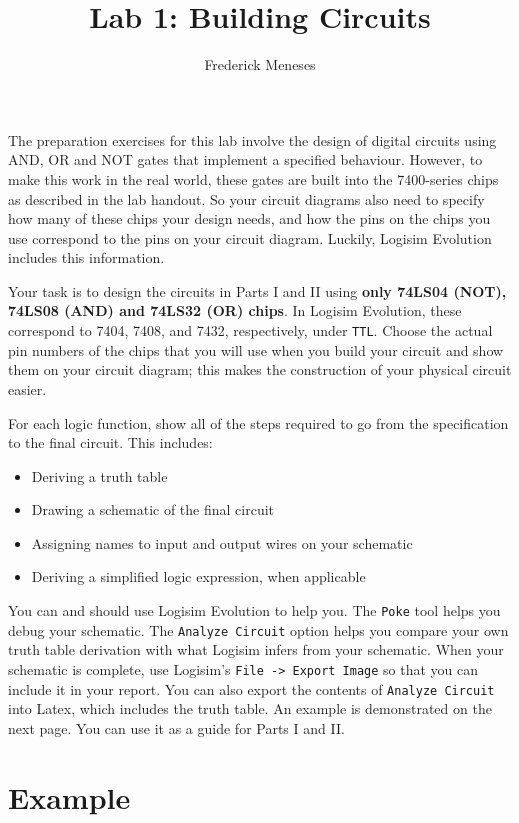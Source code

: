 \documentclass{article}
\title{Lab 1: Building Circuits}
\author{Frederick Meneses}
\begin{document}
\maketitle

The preparation exercises for this lab involve the design of digital circuits using AND, OR and NOT gates that implement a specified behaviour.
However, to make this work in the real world, these gates are built into the 7400-series chips as described in the lab handout.
So your circuit diagrams also need to specify how many of these chips your design needs, and how the pins on the chips you use correspond to the pins on your circuit diagram.
Luckily, Logisim Evolution includes this information.

Your task is to design the circuits in Parts I and II using \textbf{only 74LS04 (NOT), 74LS08 (AND) and 74LS32 (OR) chips}.
In Logisim Evolution, these correspond to 7404, 7408, and 7432, respectively, under \verb|TTL|.
Choose the actual pin numbers of the chips that you will use when you build your circuit and show them on your circuit diagram;
this makes the construction of your physical circuit easier.

For each logic function, show all of the steps required to go from the specification to the final circuit.
This includes:

\begin{itemize}
\item Deriving a truth table
\item Drawing a schematic of the final circuit
\item Assigning names to input and output wires on your schematic
\item Deriving a simplified logic expression, when applicable
\end{itemize}

You can and should use Logisim Evolution to help you.
The \verb|Poke| tool helps you debug your schematic.
The \verb|Analyze Circuit| option helps you compare your own truth table derivation with what Logisim infers from your schematic.
When your schematic is complete, use Logisim's \verb|File -> Export Image| so that you can include it in your report.
You can also export the contents of \verb|Analyze Circuit| into Latex, which includes the truth table.
An example is demonstrated on the next page.
You can use it as a guide for Parts I and II.

\newpage
\section*{Example}
\end{document}
